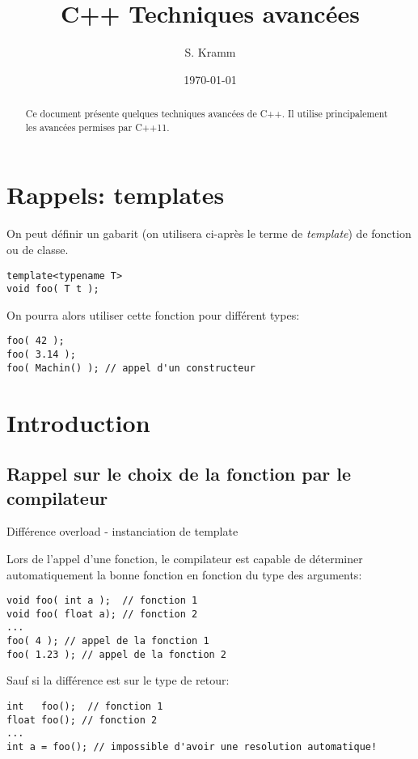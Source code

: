 \documentclass[11pt,a4paper]{article}
\author{S. Kramm}
\title{C++ Techniques avancées}
\date{\today}
\begin{document}
\maketitle

\begin{abstract}
Ce document présente quelques techniques avancées de C++.
Il utilise principalement les avancées permises par C++11.
\end{abstract}

\section{Rappels: templates}

On peut définir un gabarit (on utilisera ci-après le terme de {\em template}) de fonction ou de classe.

\begin{lstlisting}
template<typename T>
void foo( T t );
\end{lstlisting}

On pourra alors utiliser cette fonction pour différent types:
\begin{lstlisting}
foo( 42 );
foo( 3.14 );
foo( Machin() ); // appel d'un constructeur
\end{lstlisting}





\section{Introduction}

\subsection{Rappel sur le choix de la fonction par le compilateur}

Différence overload - instanciation de template

Lors de l'appel d'une fonction, le compilateur est capable de déterminer automatiquement la bonne fonction en fonction du type des arguments:
\begin{lstlisting}
void foo( int a );  // fonction 1
void foo( float a); // fonction 2
...
foo( 4 ); // appel de la fonction 1
foo( 1.23 ); // appel de la fonction 2
\end{lstlisting}

Sauf si la différence est sur le type de retour:
\begin{lstlisting}
int   foo();  // fonction 1
float foo(); // fonction 2
...
int a = foo(); // impossible d'avoir une resolution automatique!
\end{lstlisting}
\end{document}
